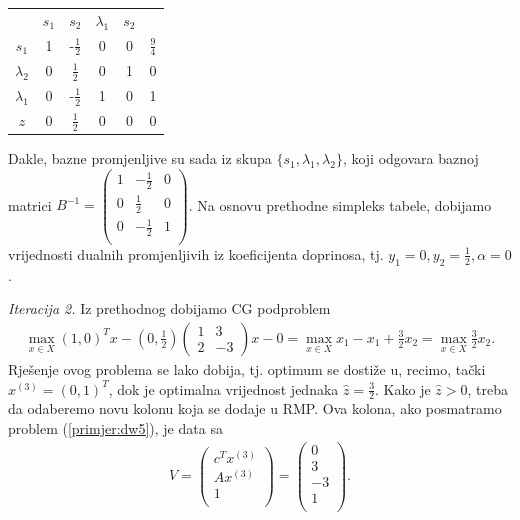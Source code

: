 \documentclass[b5paper, utf8, 11pt, colorlinks]{book}
\theoremstyle{definition}
\begin{document}
\begin{center}
	
	\begin{tabular}{c|ccccc}
	             	&$s_1$     &    $ s_2$                &  $\lambda_1$   & $s_2$     &                \\
		$s_1$	    &   1      &   -$\frac{1}{2}$         &   0         &     0         &  $\frac{9}{4}$ \\
		$\lambda_2$ &   0      &    $\frac{1}{2}$         &   0         &     1         &  0             \\
		$\lambda_1$ &   0      &    -$\frac{1}{2}$        &   1         &     0         &  1             \\ \hline
		$z$         &   0      &    $\frac{1}{2}$         &   0         &    0          &  0
	\end{tabular}
\end{center} 
Dakle, bazne promjenljive su sada iz skupa $\{s_1, \lambda_1, \lambda_2\}$, koji odgovara baznoj matrici 
$B^{-1} = 
\begin{pmatrix}
	   1 & -\frac{1}{2}    &  0 \\
	   0 & \frac{1}{2}     &  0  \\
	   0 & -\frac{1}{2}    &  1  \\
\end{pmatrix}$.
Na osnovu prethodne simpleks tabele, dobijamo   vrijednosti dualnih promjenljivih iz koeficijenta doprinosa, tj. $y_1 = 0, y_2 = \frac{1}{2}, \alpha = 0$. 


\vspace{5mm}

\emph{Iteracija 2.} Iz prethodnog dobijamo CG podproblem 
\begin{align}
	 \max_{x \in X} (1, 0)^T x - \left(0, \frac{1}{2}\right)\left(\begin{array}{cc}
	 	1 & 3 \\
	 	2 & -3
	 \end{array}\right)  x   - 0 = \max_{x \in X}x_1 - x_1 + \frac{3}{2}x_2 = \max_{x \in X} \frac{3}{2}x_2.
\end{align}
Rješenje ovog problema se lako dobija, tj. optimum se dostiže u, recimo,  tački $x^{(3)}= (0, 1)^T$, dok je optimalna vrijednost jednaka $\hat{z}= \frac{3}{2}$. Kako je $\hat{z} > 0$, treba da odaberemo novu kolonu koja se dodaje u RMP. 
Ova kolona, ako posmatramo problem (\ref{primjer:dw5}), je   data sa 
\begin{align}
	V =   \begin{pmatrix}
		c^T  x^{(3)}\\
		A  x^{(3)}  \\
		1     \\
	\end{pmatrix} = \begin{pmatrix}
		0 \\
		3  \\
		-3  \\
		1\\  
	\end{pmatrix}.
\end{align}
\end{document}
